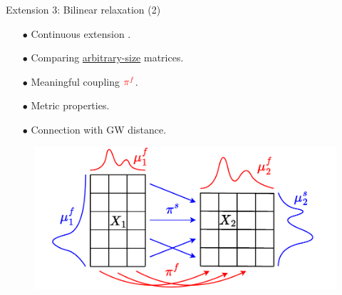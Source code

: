 \documentclass{beamer}
\newcommand{\pif}{{\color{red}{\pi^f}}}
\begin{document}
\begin{frame}{Extension 3: Bilinear relaxation (2)}
\vspace{-0.3cm}
\begin{minipage}[t]{0.6\linewidth}
  \begin{itemize}
    \item[$\bullet$] Continuous extension \parencite{Chowdhury21b}.
    \item[$\bullet$] Comparing \underline{arbitrary-size} matrices.
    \item[$\bullet$] Meaningful {\color{red}{feature}} coupling $\pif$.
    \item[$\bullet$] Metric properties.
    \item[$\bullet$] Connection with GW distance.
  \end{itemize}
  \end{minipage}%
  \hfill%
  \hspace{-6cm}
  \begin{minipage}[t]{0.55\linewidth}
    \vspace{0.5cm}
  \begin{figure}
    \centering
    \includegraphics[width=1.15\linewidth, keepaspectratio=true]{OT_new/coot_matrix_ot.pdf}
  \end{figure}
\end{minipage}

\end{frame}
\end{document}
